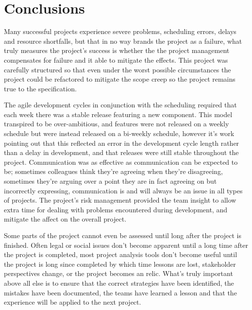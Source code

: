 \section{Conclusions}

Many successful projects experience severe problems, scheduling errors, delays and resource shortfalls, but that in no way brands the project as a failure, what truly measures the project's success is whether the the project management compensates for failure and it able to mitigate the effects. This project was carefully structured so that even under the worst possible circumstances the project could be refactored to mitigate the scope creep so the project remains true to the specification. 

The agile development cycles in conjunction with the scheduling required that each week there was a stable release featuring a new component. This model transpired to be over-ambitious, and features were not released on a weekly schedule but were instead released on a bi-weekly schedule, however it's work pointing out that this reflected an error in the development cycle length rather than a delay in development, and that releases were still stable throughout the project. Communication was as effective as communication can be expected to be; sometimes colleagues think they're agreeing when they're disagreeing, sometimes they're arguing over a point they are in fact agreeing on but incorrectly expressing, communication is and will always be an issue in all types of projects. The project's risk management provided the team insight to allow extra time for dealing with problems encountered during development, and mitigate the affect on the overall project.

Some parts of the project cannot even be assessed until long after the project is finished. Often legal or social issues don't become apparent until a long time after the project is completed, most project analysis tools don't become useful until the project is long since completed by which time lessons are lost, stakeholder perspectives change, or the project becomes an relic. What's truly important above all else is to ensure that the correct strategies have been identified, the mistakes have been documented, the teams have learned a lesson and that the experience will be applied to the next project.